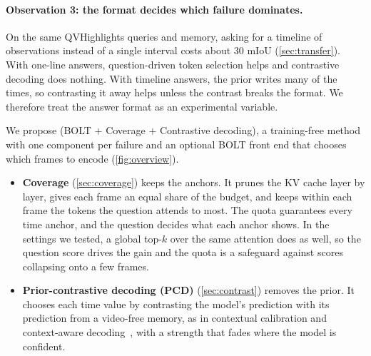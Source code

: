 \paragraph{Observation 3: the format decides which failure dominates.}
On the same QVHighlights queries and memory, asking for a timeline of observations instead of a single interval costs
about 30 mIoU (\cref{sec:transfer}). With one-line answers, question-driven token selection helps and contrastive
decoding does nothing. With timeline answers, the prior writes many of the times, so contrasting it away helps unless
the contrast breaks the format. We therefore treat the answer format as an experimental variable.

\medskip
We propose \method (BOLT $+$ Coverage $+$ Contrastive decoding), a training-free method with one component per
failure and an optional BOLT front end that chooses which frames to encode (\cref{fig:overview}).
\begin{itemize}
  \item \textbf{Coverage} (\cref{sec:coverage}) keeps the anchors. It prunes the KV cache layer by layer, gives each
  frame an equal share of the budget, and keeps within each frame the tokens the question attends to most. The quota
  guarantees every time anchor, and the question decides what each anchor shows. In the settings we tested, a global
  top-$k$ over the same attention does as well, so the question score drives the gain and the quota is a safeguard
  against scores collapsing onto a few frames.
  \item \textbf{Prior-contrastive decoding (PCD)} (\cref{sec:contrast}) removes the prior. It chooses each time value
  by contrasting the model's prediction with its prediction from a video-free memory, as in contextual calibration
  and context-aware decoding~\cite{calibratebeforeuse,cad}, with a strength that fades where the model is confident.
\end{itemize}

